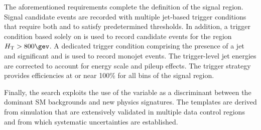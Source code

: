 The aforementioned requirements complete the definition of the signal
region. Signal candidate events are recorded with multiple jet-based
trigger conditions that require both \scalht and \alphat to satisfy
predetermined thresholds. In addition, a trigger condition based
solely on \scalht is used to record candidate events for
the region $\scalht > 800\gev$. A dedicated trigger condition
comprising the presence of a jet and significant \mht and \ETmiss is
used to record monojet events. The trigger-level jet energies are
corrected to account for energy scale and pileup effects. The trigger
strategy provides efficiencies at or near 100\% for all bins of the
signal region.

Finally, the search exploits the use of the \mht variable as a
discriminant between the dominant SM backgrounds and new physics
signatures. The \mht templates are derived from simulation that are
extensively validated in multiple data control regions and from which
systematic uncertainties are established.
